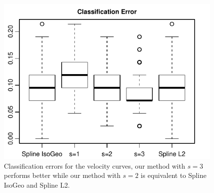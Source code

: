 \begin{figure}
\centering
\includegraphics[height=0.3\textheight]{./Erreur_classification_velocity.pdf}
\caption{Classification errors for the velocity curves, our method with $s=3$ performs better while our method with $s=2$ is equivalent to Spline IsoGeo and Spline L2.}
\label{fig:class_err_velo}
\end{figure}






 


% 

